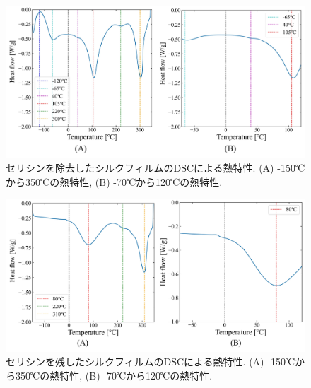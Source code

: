 \documentclass[dvipdfmx,12pt,a4paper]{jreport}
\begin{document}
		\begin{figure}[h]
			\centering
			\includegraphics[width=\linewidth]{熱プレスシルクフィルム_DSC.jpg}
			\caption{セリシンを除去したシルクフィルムのDSCによる熱特性. (A) -150℃から350℃の熱特性, 
			(B) -70℃から120℃の熱特性.}
			\label{セリシン除去フィルムにおけるDSC}
		\end{figure}
		\begin{figure}[H]
			\centering
			\includegraphics[width=\linewidth]{セリシンあり_熱プレスシルクフィルム_DSC.jpg}
			\caption{セリシンを残したシルクフィルムのDSCによる熱特性. (A) -150℃から350℃の熱特性, 
			(B) -70℃から120℃の熱特性.}
			\label{セリシンありフィルムにおけるDSC}
		\end{figure}
\end{document}
